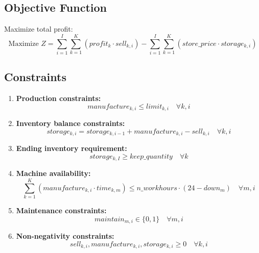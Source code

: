 \documentclass{article}
\begin{document}
\subsection*{Objective Function}
Maximize total profit:
\begin{equation}
\text{Maximize } Z = \sum_{i=1}^{I} \sum_{k=1}^{K} (profit_{k} \cdot sell_{k, i}) - \sum_{i=1}^{I} \sum_{k=1}^{K} (store\_price \cdot storage_{k, i})
\end{equation}

\subsection*{Constraints}

\begin{enumerate}

    \item \textbf{Production constraints:}
    \begin{equation}
    manufacture_{k, i} \leq limit_{k, i} \quad \forall k, i
    \end{equation}
    
    \item \textbf{Inventory balance constraints:}
    \begin{equation}
    storage_{k, i} = storage_{k, i-1} + manufacture_{k, i} - sell_{k, i} \quad \forall k, i
    \end{equation}
    
    \item \textbf{Ending inventory requirement:}
    \begin{equation}
    storage_{k, I} \geq keep\_quantity \quad \forall k
    \end{equation}

    \item \textbf{Machine availability:}
    \begin{equation}
    \sum_{k=1}^{K} (manufacture_{k, i} \cdot time_{k, m}) \leq n\_workhours \cdot (24 - down_{m}) \quad \forall m, i
    \end{equation}
    
    \item \textbf{Maintenance constraints:}
    \begin{equation}
    maintain_{m, i} \in \{0, 1\} \quad \forall m, i
    \end{equation}
    
    \item \textbf{Non-negativity constraints:}
    \begin{equation}
    sell_{k, i}, manufacture_{k, i}, storage_{k, i} \geq 0 \quad \forall k, i
    \end{equation}

\end{enumerate}
\end{document}

